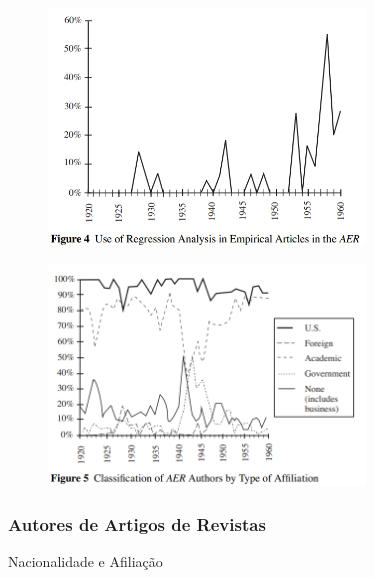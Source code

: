 \documentclass[12pt]{article}
\begin{document}
\begin{figure}[H]
    \centering
    \includegraphics[width=0.75\textwidth]{4º Período/História do Pensamento Econômico/Tradução HPE/Tradução Tópico 7.2/figure 4.png}
    \end{figure}

\begin{figure}[H]
    \centering
    \includegraphics[width=0.75\textwidth]{4º Período/História do Pensamento Econômico/Tradução HPE/Tradução Tópico 7.2/figure 5.png}
    \end{figure}

\subsubsection{\textbf{Autores de Artigos de Revistas}}
Nacionalidade e Afiliação
\end{document}
